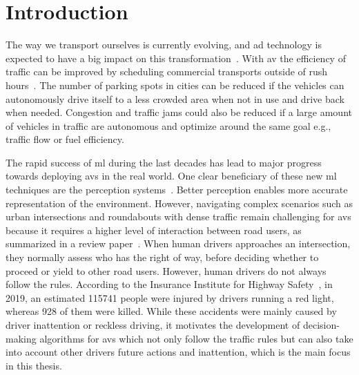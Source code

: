 \chapter{Introduction} \label{ch:intro}
The way we transport ourselves is currently evolving, and \gls{ad} technology is expected to have a big impact on this transformation~\cite{traffic21, McKinsey2023}. With \gls{av} the efficiency of traffic can be improved by scheduling commercial transports outside of rush hours~\cite{FAGNANT2015167}. The number of parking spots in cities can be reduced if the vehicles can autonomously drive itself to a less crowded area when not in use and drive back when needed. Congestion and traffic jams could also be reduced if a large amount of vehicles in traffic are autonomous and optimize around the same goal e.g., traffic flow or fuel efficiency. 

The rapid success of \gls{ml} during the last decades has lead to major progress towards deploying \gls{av}s in the real world. One clear beneficiary of these new \gls{ml} techniques are the perception systems~\cite{Janai2020}. Better perception enables more accurate representation of the environment. 
However, navigating complex scenarios such as urban intersections and roundabouts with dense traffic remain challenging for \gls{av}s because it requires a higher level of interaction between road users, as summarized in a review paper~\cite{Schwarting2018}. 
When human drivers approaches an intersection, they normally assess who has the right of way, before deciding whether to proceed or yield to other road users. However, human drivers do not always follow the rules.
According to the Insurance Institute for Highway Safety~\cite{IIHS2019}, in 2019, an estimated \num{115741} people were injured by drivers running a red light, whereas \num{928} of them were killed. 
While these accidents were mainly caused by driver inattention or reckless driving, it motivates the development of decision-making algorithms for \gls{av}s which not only follow the traffic rules but can also take into account other drivers future actions and inattention, which is the main focus in this thesis. 

